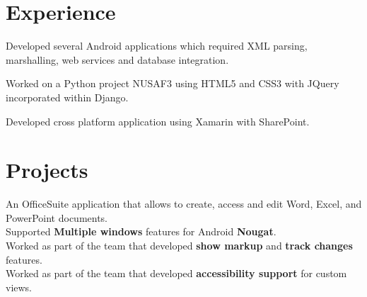 \documentclass[a4paper]{arun-resume} %
\begin{document}
\hfill
%
%
\begin{minipage}[t]{0.65\textwidth} %


\section{Experience}


\vspace{\topsep} %

\begin{tightitemize}
\item Developed several Android applications which required XML parsing, marshalling, web services and database integration.
\item Worked on a Python project NUSAF3 using HTML5 and CSS3 with JQuery incorporated within Django.
\item Developed cross platform application using Xamarin with SharePoint.
\end{tightitemize}

\sectionspace %



\section{Projects}



An OfficeSuite application that allows to
create, access and edit Word, Excel, and PowerPoint documents.\\
Supported \textbf{Multiple windows} features for Android \textbf{Nougat}. \\
Worked as part of the team that developed \textbf{show markup} and \textbf{track changes} features. \\
Worked as part of the team that developed \textbf{accessibility support} for custom views.


\end{minipage}
\end{document}
